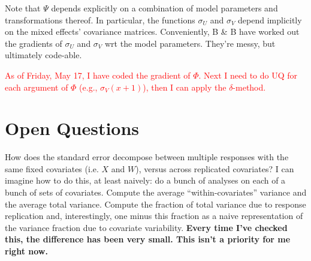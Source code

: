 \documentclass{article}
\begin{document}
Note that $\Psi$ depends explicitly on a combination of model parameters and transformations thereof. In particular, the functions $\sigma_U$ and $\sigma_V$ depend implicitly on the mixed effects' covariance matrices. Conveniently, B \& B have worked out the gradients of $\sigma_U$ and $\sigma_V$ wrt the model parameters. They're messy, but ultimately code-able.

\textcolor{red}{As of Friday, May 17, I have coded the gradient of $\Phi$. Next I need to do UQ for each argument of $\Phi$ (e.g., $\sigma_V(x+1)$), then I can apply the $\delta$-method.}



\section{Open Questions}

How does the standard error decompose between multiple responses with the same fixed covariates (i.e. $X$ and $W$), versus across replicated covariates? I can imagine how to do this, at least naively: do a bunch of analyses on each of a bunch of sets of covariates. Compute the average ``within-covariates'' variance and the average total variance. Compute the fraction of total variance due to response replication and, interestingly, one minus this fraction as a naive representation of the variance fraction due to covariate variability. \textbf{Every time I've checked this, the difference has been very small. This isn't a priority for me right now.}
\end{document}
